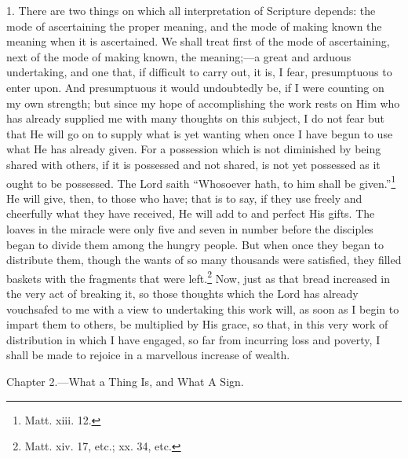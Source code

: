 1. There are two things on which all interpretation of Scripture depends: the mode of ascertaining the proper meaning, and the mode of making known the meaning when it is ascertained. We shall treat first of the mode of ascertaining, next of the mode of making known, the meaning;—a great and arduous undertaking, and one that, if difficult to carry out, it is, I fear, presumptuous to enter upon. And presumptuous it would undoubtedly be, if I were counting on my own strength; but since my hope of accomplishing the work rests on Him who has already supplied me with many thoughts on this subject, I do not fear but that He will go on to supply what is yet wanting when once I have begun to use what He has already given. For a possession which is not diminished by being shared with others, if it is possessed and not shared, is not yet possessed as it  ought to be possessed. The Lord saith “Whosoever hath, to him shall be given.”\footnote{Matt. xiii. 12.} He will give, then, to those who have; that is to say, if they use freely and cheerfully what they have received, He will add to and perfect His gifts. The loaves in the miracle were only five and seven in number before the disciples began to divide them among the hungry people. But when once they began to distribute them, though the wants of so many thousands were satisfied, they filled baskets with the fragments that were left.\footnote{Matt. xiv. 17, etc.; xx. 34, etc.} Now, just as that bread increased in the very act of breaking it, so those thoughts which the Lord has already vouchsafed to me with a view to undertaking this work will, as soon as I begin to impart them to others, be multiplied by His grace, so that, in this very work of distribution in which I have engaged, so far from incurring loss and poverty, I shall be made to rejoice in a marvellous increase of wealth.


Chapter 2.—What a Thing Is, and What A Sign.

